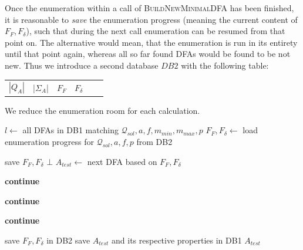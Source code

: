 Once the enumeration within a call of \textsc{BuildNewMinimalDFA} has been finished, it is reasonable to \emph{save} the enumeration progress (meaning the current content of $F_F, F_\delta$), such that during the next call enumeration can be resumed from that point on. The alternative would mean, that the enumeration is run in its entirety until that point again, whereas all so far found DFAs would be found to be not new. Thus we introduce a second database $DB2$ with the following table:
\begin{center}
	\begin{tabular}{c c c c c c}
		$|Q_A|$ & |$\Sigma_A$| & $F_F$ & $F_\delta$
	\end{tabular}
\end{center}
We reduce the enumeration room for each calculation.
\vspace{0.2cm}
\begin{algorithmic}[1]
	
		\vspace{0.2cm}
	
		\State $l \gets$ all DFAs in DB1 matching $\mathcal{Q}_{sol}, a, f, m_{min}, m_{max}, p$
		\State $F_F, F_\delta \gets$ load enumeration progress for $\mathcal{Q}_{sol}, a, f, p$ from DB2
		
		\vspace{0.2cm}
		
		
			\vspace{0.2cm}
		
				\State save $F_F, F_\delta$
				\State\Return $\bot$
			\EndIf
			\State $A_{test} \gets$ next DFA based on $F_F, F_\delta$
			
			\vspace{0.2cm}
			
				\State \textbf{continue}
			\EndIf
			
				\State \textbf{continue}
			\EndIf
			
				\State \textbf{continue}
			\EndIf
			
			\vspace{0.2cm}
			
			\State save $F_F, F_\delta$ in DB2
			\State save $A_{test}$ and its respective properties in DB1
			\State\Return $A_{test}$
		\EndWhile
	\EndFunction
\end{algorithmic}
\vspace{0.2cm}

